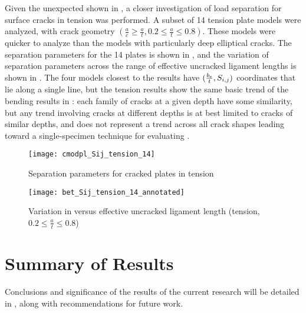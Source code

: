 Given the unexpected shown in , a closer investigation of load separation for surface cracks in tension was performed.
A subset of 14 tension plate models were analyzed, with crack geometry \((\frac{a}{c} \geq \frac{a}{t}, 0.2 \leq \frac{a}{t} \leq 0.8)\).
These models were quicker to analyze than the models with particularly deep elliptical cracks.
The separation parameters for the 14 plates is shown in , and the variation of separation parameters across the range of effective uncracked ligament lengths is shown in .
The four models closest to the \citeauthor{sharobeamlandes1993} results have \((\frac{b_\text{e}}{t}, S_{i,j})\) coordinates that lie along a single line, but the tension results show the same basic trend of the bending results in : each family of cracks at a given depth have some similarity, but any trend involving cracks at different depths is at best limited to cracks of similar depths, and does not represent a trend across all crack shapes leading toward a single-specimen technique for evaluating \J.
\begin{figure}[tbp]
\centering
\texttt{[image: cmodpl\_Sij\_tension\_14]}
\caption{\label{fig:cmodpl_Sij_tension_14} Separation parameters for cracked plates in tension}
\end{figure}
\begin{figure}[tbp]
\centering
\texttt{[image: bet\_Sij\_tension\_14\_annotated]}
\caption{\label{fig:bet_Sij_tension_14_annotated} Variation in \Sij versus effective uncracked ligament length (tension, \(0.2 \leq \frac{a}{t} \leq 0.8\))}
\end{figure}

\section{Summary of Results}

Conclusions and significance of the results of the current research will be detailed in , along with recommendations for future work.
